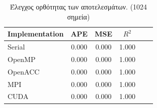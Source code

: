 \documentclass[11pt]{scrartcl} %
\begin{document}
\begin{table}[H]
    \centering
    \begin{tabular}{|l|c|c|c|c|c|}
    \hline
        Implementation & APE   & MSE   & $R^2$ \\ \hline
        Serial         & 0.000 & 0.000 & 1.000 \\
        OpenMP         & 0.000 & 0.000 & 1.000 \\
        OpenACC        & 0.000 & 0.000 & 1.000 \\
        MPI            & 0.000 & 0.000 & 1.000 \\
        CUDA           & 0.000 & 0.000 & 1.000 \\
    \hline
    \end{tabular}

    \caption{Έλεγχος ορθότητας των αποτελεσμάτων. (1024 σημεία)}
\end{table}




\end{document}
